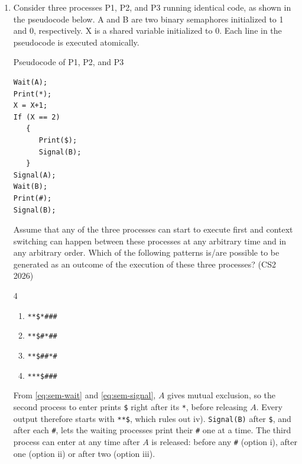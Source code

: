 \begin{enumerate}[label=\thesubsection.\arabic*, ref=\thesubsection.\theenumi]
The following code tries all 32 assignments and prints the valid ones.
\begin{lstlisting}
codes/stackqueue.c
\end{lstlisting}

\item Consider three processes P1, P2, and P3 running identical code, as
shown in the pseudocode below. A and B are two binary semaphores
initialized to 1 and 0, respectively. X is a shared variable initialized to
0. Each line in the pseudocode is executed atomically.

\par\medskip\noindent\begin{minipage}{\linewidth}
\centering Pseudocode of P1, P2, and P3
\begin{lstlisting}[xleftmargin=0.3\linewidth, xrightmargin=0.3\linewidth]
Wait(A);
Print(*);
X = X+1;
If (X == 2)
   {
      Print($);
      Signal(B);
   }
Signal(A);
Wait(B);
Print(#);
Signal(B);
\end{lstlisting}
\end{minipage}\par\medskip
Assume that any of the three processes can start to execute first and
context switching can happen between these processes at any arbitrary time
and in any arbitrary order. Which of the following patterns is/are possible
to be generated as an outcome of the execution of these three processes?
\hfill (CS2 2026)
\begin{multicols}{4}
\begin{enumerate}[label=\roman*)]
  \item \texttt{**\$*\#\#\#}
  \item \texttt{**\$\#*\#\#}
  \item \texttt{**\$\#\#*\#}
  \item \texttt{***\$\#\#\#}
\end{enumerate}
\end{multicols}
\solution From \eqref{eq:sem-wait} and \eqref{eq:sem-signal}, $A$ gives
mutual exclusion, so the second process to enter prints \texttt{\$} right
after its \texttt{*}, before releasing $A$. Every output therefore starts
with \texttt{**\$}, which rules out iv). \texttt{Signal(B)} after
\texttt{\$}, and after each \texttt{\#}, lets the waiting processes print
their \texttt{\#} one at a time. The third process can enter at any time
after $A$ is released: before any \texttt{\#} (option i), after one
(option ii) or after two (option iii).


\end{enumerate}
